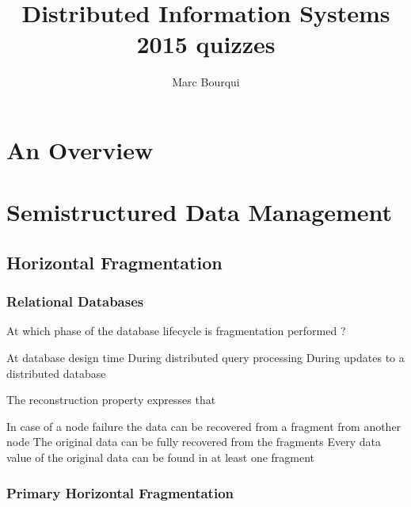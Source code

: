 \documentclass[12pt,a4paper]{exam} %
\author{Marc Bourqui}
\title{Distributed Information Systems 2015 quizzes}
\begin{document}
\section{An Overview}

\section{Semistructured Data Management}

\subsection{Horizontal Fragmentation}
\subsubsection{Relational Databases}
\begin{questions}
\question At which phase of the database lifecycle is fragmentation performed ?
\begin{checkboxes}
\CorrectChoice At database design time
\choice During distributed query processing
\choice During updates to a distributed database
\end{checkboxes}

\question The reconstruction property expresses that
\begin{checkboxes}
\choice In case of a node failure the data can be recovered from a fragment from another node
\CorrectChoice The original data can be fully recovered from the fragments
\choice Every data value of the original data can be found in at least one fragment
\end{checkboxes}

\end{questions}

\subsubsection{Primary Horizontal Fragmentation} %
\end{document}
